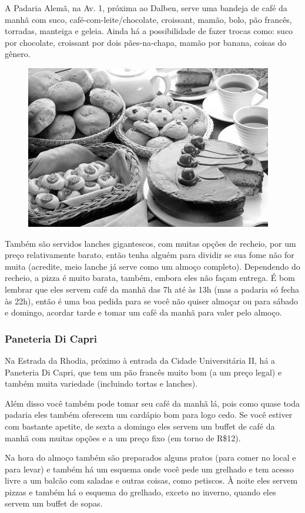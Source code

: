 A Padaria Alemã, na Av. 1, próxima ao Dalben, serve uma bandeja de café da manhã
com suco, café-com-leite/chocolate, croissant, mamão, bolo, pão francês,
torradas, manteiga e geleia. Ainda há a possibilidade de fazer trocas como: suco
por chocolate, croissant por dois pães-na-chapa, mamão por banana, coisas do
gênero.
\begin{figure}[h!]
    \centering
    \includegraphics[width=.45\textwidth]{img/barao/padaria.jpg}
\end{figure}

Também são servidos lanches gigantescos, com muitas opções de recheio, por um
preço relativamente barato, então tenha alguém para dividir se sua fome não for
muita (acredite, meio lanche já serve como um almoço completo). Dependendo do
recheio, a pizza é muito barata, também, embora eles não façam entrega. É bom
lembrar que eles servem café da manhã das 7h até às 13h (mas a padaria só fecha
às 22h), então é uma boa pedida para se você não quiser almoçar ou para sábado e
domingo, acordar tarde e tomar um café da manhã para valer pelo almoço.

\subsubsection{Paneteria Di Capri}

Na Estrada da Rhodia, próximo à entrada da Cidade Universitária II, há a
Paneteria Di Capri, que tem um pão francês muito bom (a um preço legal) e também
muita variedade (incluindo tortas e lanches).

Além disso você também pode tomar seu café da manhã lá, pois como quase toda
padaria eles também oferecem um cardápio bom para logo cedo. Se você estiver com
bastante apetite, de sexta a domingo eles servem um buffet de café da manhã com
muitas opções e a um preço fixo (em torno de R\$12).

Na hora do almoço também são preparados alguns pratos (para comer no local e
para levar) e também há um esquema onde você pede um grelhado e tem acesso livre
a um balcão com saladas e outras coisas, como petiscos. À noite eles servem
pizzas e também há o esquema do grelhado, exceto no inverno, quando eles servem
um buffet de sopas.

